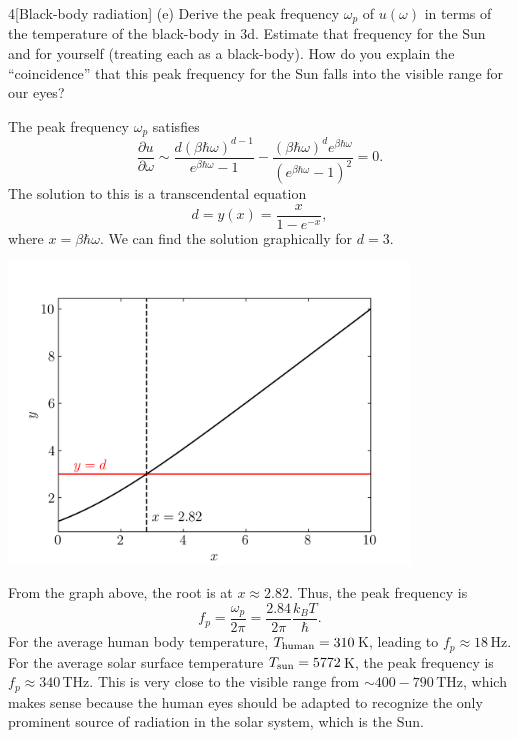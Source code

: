 \documentclass[12pt]{article}
\begin{document}
\begin{problem}{4}[Black-body radiation]
(e) Derive the peak frequency $\omega_p$ of $u(\omega)$ in terms of the
temperature of the black-body in 3d. Estimate that frequency for the Sun and for
yourself (treating each as a black-body). How do you explain the
``coincidence'' that this peak frequency for the Sun falls into the visible
range for our eyes?
\begin{solution}
The peak frequency $\omega_p$ satisfies
\begin{equation}
    \frac{\partial
    u}{\partial\omega}\sim\frac{d(\beta\hbar\omega)^{d-1}}{e^{\beta\hbar\omega}-1}-\frac{(\beta\hbar\omega)^de^{\beta\hbar\omega}}{(e^{\beta\hbar\omega}-1)^2}=0. 
\end{equation}
The solution to this is a transcendental equation
\begin{equation}
    d=y(x)=\frac{x}{1-e^{-x}}, 
\end{equation}
where $x=\beta\hbar\omega$. We can find the solution graphically for 
$d=3$.
\begin{center}
    \includegraphics[width=0.8\textwidth]{p4.png} 
\end{center}
From the graph above, the root is at $x\approx 2.82$. Thus, the peak frequency
is
\begin{equation}
    f_p=\frac{\omega_p}{2\pi}=\frac{2.84}{2\pi}\frac{k_BT}{\hbar}. 
\end{equation}
For the average human body temperature, $T_{\text{human}}=310$\,\si{K}, leading to
$f_p\approx 18$\,\si{Hz}. For the average solar surface temperature
$T_{\text{sun}}=5772$\,\si{K}, the peak frequency is $f_p\approx 340$\,\si{THz}. This
is very close to the visible range from $\sim 400-790$\,\si{THz}, which makes
sense because the human eyes should be adapted to recognize the only prominent 
source of radiation in the solar system, which is the Sun.
\end{solution}


\end{problem}
\end{document}

